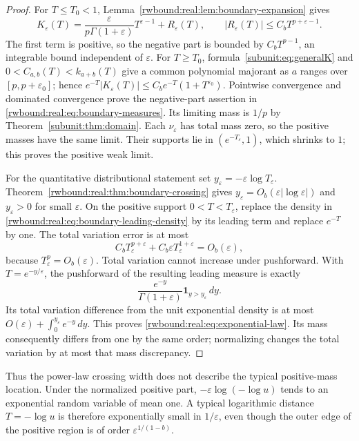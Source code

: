 \begin{proof}
For $T\leq T_0<1$, Lemma~\ref{rwbound:real:lem:boundary-expansion} gives
\begin{equation}\label{rwbound:real:eq:boundary-leading-density}
 K_\varepsilon(T)=
 \frac{\varepsilon}{p\Gamma(1+\varepsilon)}T^{\varepsilon-1}
       +R_\varepsilon(T),\qquad
 |R_\varepsilon(T)|\leq C_bT^{p+\varepsilon-1}.
\end{equation}
The first term is positive, so the negative part is bounded by
$C_bT^{p-1}$, an integrable bound independent of $\varepsilon$.
For $T\geq T_0$, formula~\eqref{subunit:eq:generalK} and
$0<C_{a,b}(T)<k_{a+b}(T)$ give a common polynomial majorant as
$a$ ranges over $[p,p+\varepsilon_0]$; hence
$e^{-T}|K_\varepsilon(T)|\leq
C_be^{-T}(1+T^{\varepsilon_0})$. Pointwise convergence and dominated
convergence prove the negative-part assertion in
\eqref{rwbound:real:eq:boundary-measures}. Its limiting mass is $1/p$ by
Theorem~\ref{subunit:thm:domain}. Each $\nu_\varepsilon$ has total
mass zero, so the positive masses have the same limit. Their supports
lie in $(e^{-T_\varepsilon},1)$, which shrinks to $1$; this proves
the positive weak limit.

For the quantitative distributional statement set
$y_\varepsilon=-\varepsilon\log T_\varepsilon$.
Theorem~\ref{rwbound:real:thm:boundary-crossing} gives
$y_\varepsilon=O_b(\varepsilon|\log\varepsilon|)$ and
$y_\varepsilon>0$ for small $\varepsilon$.
On the positive support $0<T<T_\varepsilon$, replace the density
in \eqref{rwbound:real:eq:boundary-leading-density} by its leading term
and replace $e^{-T}$ by one. The total variation error is at most
\[
 C_bT_\varepsilon^{p+\varepsilon}
     +C_b\varepsilon T_\varepsilon^{1+\varepsilon}
 =O_b(\varepsilon),
\]
because $T_\varepsilon^p=O_b(\varepsilon)$.
Total variation cannot increase under pushforward. With
$T=e^{-y/\varepsilon}$, the pushforward of the resulting leading
measure is exactly
\[
 \frac{e^{-y}}{\Gamma(1+\varepsilon)}
          \mathbf1_{y>y_\varepsilon}\,dy.
\]
Its total variation difference from the unit exponential density
is at most
$O(\varepsilon)+\int_0^{y_\varepsilon}e^{-y}\,dy$.
This proves \eqref{rwbound:real:eq:exponential-law}. Its mass consequently
differs from one by the same order; normalizing changes the total
variation by at most that mass discrepancy.
\end{proof}

Thus the power-law crossing width does not describe the typical
positive-mass location. Under the normalized positive part,
$-\varepsilon\log(-\log u)$ tends to an exponential random variable
of mean one. A typical logarithmic distance $T=-\log u$ is therefore
exponentially small in $1/\varepsilon$, even though the outer edge of
the positive region is of order $\varepsilon^{1/(1-b)}$.

